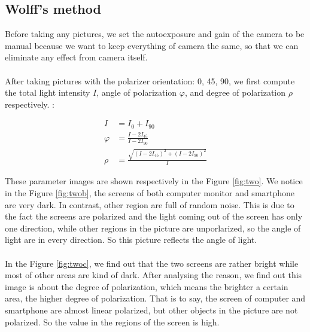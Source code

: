 \documentclass[english]{article}
\begin{document}
\subsection{Wolff's method}
Before taking any pictures, we set the autoexposure and gain of the camera to be manual because we want to keep everything of camera the same, so that we can eliminate any effect from camera itself.\\
\\
After taking pictures with the polarizer orientation: 0\textdegree, 45\textdegree, 90\textdegree, we first compute the total light intensity $I$, angle of polarization $\varphi$, and degree of polarization $\rho$ respectively. :

\begin{align*} 
	I &= I_{0} + I_{90}\\
	\varphi &= \frac{I - 2I_{45}} {I - 2I_{90}}\\
	\rho &= \frac{\sqrt{(I-2I_{45})^{2} + (I-2I_{90})^{2}}}{I}
\end{align*}

These parameter images are shown respectively in the Figure \ref{fig:two}. We notice in the Figure \ref{fig:twob}, the screens of both computer monitor and smartphone are very dark. In contrast, other region are full of random noise. This is due to the fact the screens are polarized and the light coming out of the screen has only one direction, while other regions in the picture are unporlarized, so the angle of light are in every direction. So this picture reflects the angle of light. \\
\\
In the Figure \ref{fig:twoc}, we find out that the two screens are rather bright while most of other areas are kind of dark. After analysing the reason, we find out this image is about the degree of polarization, which means the brighter a certain area, the higher degree of polarization. That is to say, the screen of computer and smartphone are almost linear polarized, but other objects in the picture are not polarized. So the value in the regions of the screen is  high.
\end{document}
